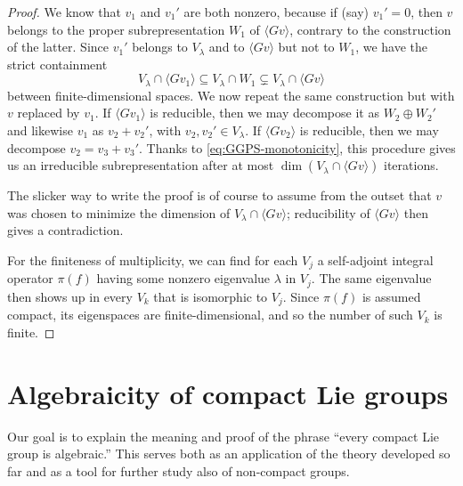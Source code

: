 \documentclass[reqno]{amsart} 
\begin{document}
\begin{proof}
  We know that $v_1$ and $v_1'$ are both nonzero, because if (say) $v_1' = 0$, then $v$ belongs to the proper subrepresentation $W_1$ of $\langle G v \rangle$, contrary to the construction of the latter.  Since $v_1'$ belongs to $V_\lambda$ and to $\langle G v \rangle$ but not to $W_1$, we have the strict containment
  \begin{equation}\label{eq:GGPS-monotonicity}
    V_\lambda \cap \langle G v_1 \rangle
    \subseteq 
    V_\lambda \cap W_1
    \subsetneq
    V_\lambda \cap \langle G v \rangle
  \end{equation}
  between finite-dimensional spaces.  We now repeat the same construction but with $v$ replaced by $v_1$.  If $\langle G v_1 \rangle$ is reducible, then we may decompose it as $W_2 \oplus W_2'$ and likewise $v_1$ as $v_2 + v_2'$, with $v_2, v_2' \in V_\lambda$.  If $\langle G v_2 \rangle$ is reducible, then we may decompose $v_2 = v_3 + v_3'$.  Thanks to \eqref{eq:GGPS-monotonicity}, this procedure gives us an irreducible subrepresentation after at most $\dim(V_\lambda \cap \langle G v \rangle)$ iterations.
  
  The slicker way to write the proof is of course to assume from the outset that $v$ was chosen to minimize the dimension of $V_{\lambda} \cap \langle G v \rangle$; reducibility of $\langle G v \rangle$ then gives a contradiction.
  
  For the finiteness of multiplicity, we can find for each $V_j$ a self-adjoint integral operator $\pi(f)$ having some nonzero eigenvalue $\lambda$ in $V_j$.  The same eigenvalue then shows up in every $V_k$ that is isomorphic to $V_j$.  Since $\pi(f)$ is assumed compact, its eigenspaces are finite-dimensional, and so the number of such $V_k$ is finite.
\end{proof}

\newpage



\section{Algebraicity of compact Lie groups}
Our goal is to explain the meaning and proof of the phrase ``every compact Lie group is algebraic.''  This serves both as an application of the theory developed so far and as a tool for further study also of non-compact groups.
\end{document}
